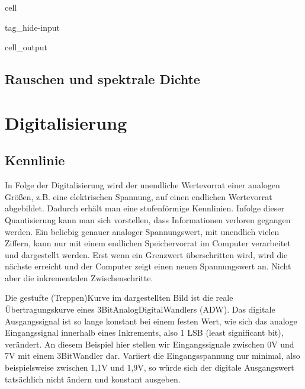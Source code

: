 \documentclass[letterpaper,10pt,english]{jupyterBook}
\begin{document}
\begin{sphinxuseclass}{cell}
\begin{sphinxuseclass}{tag_hide-input}\begin{sphinxVerbatimOutput}

\begin{sphinxuseclass}{cell_output}
\noindent{}

\end{sphinxuseclass}\end{sphinxVerbatimOutput}

\end{sphinxuseclass}
\end{sphinxuseclass}
\sphinxstepscope


\section{Rauschen und spektrale Dichte}
\label{\detokenize{content/3_Rauschen:rauschen-und-spektrale-dichte}}\label{\detokenize{content/3_Rauschen::doc}}
\sphinxstepscope


\chapter{Digitalisierung}
\label{\detokenize{content/2_Digital:digitalisierung}}\label{\detokenize{content/2_Digital::doc}}

\section{Kennlinie}
\label{\detokenize{content/2_Digital:kennlinie}}
\sphinxAtStartPar
In Folge der Digitalisierung wird der unendliche Wertevorrat einer analogen Größen, z.B. eine elektrischen Spannung, auf einen endlichen Wertevorrat abgebildet. Dadurch erhält man eine stufenförmige Kennlinien. Infolge dieser Quantisierung kann man sich vorstellen, dass Informationen verloren gegangen werden. Ein beliebig genauer analoger Spannungswert, mit unendlich vielen Ziffern, kann nur mit einem endlichen Speichervorrat im Computer verarbeitet und dargestellt werden. Erst wenn ein Grenzwert überschritten wird, wird die nächste  erreicht und der Computer zeigt einen neuen Spannungswert an. Nicht aber die inkrementalen Zwischenschritte.

\sphinxAtStartPar
{}

\sphinxAtStartPar
Die gestufte (Treppen\sphinxhyphen{})Kurve im dargestellten Bild ist die reale Übertragungskurve eines 3\sphinxhyphen{}Bit\sphinxhyphen{}Analog\sphinxhyphen{}Digital\sphinxhyphen{}Wandlers (ADW).
Das digitale Ausgangssignal ist so lange konstant bei einem festen Wert, wie sich das analoge Eingangssignal innerhalb eines Inkrements, also 1 LSB (least significant bit), verändert. An diesem Beispiel hier stellen wir Eingangssignale zwischen 0V und 7V mit einem 3\sphinxhyphen{}Bit\sphinxhyphen{}Wandler dar. Variiert die Eingangsspannung nur minimal, also beispielsweise zwischen 1,1V und 1,9V, so würde sich der digitale Ausgangswert tatsächlich nicht ändern und konstant  ausgeben.
\end{document}
